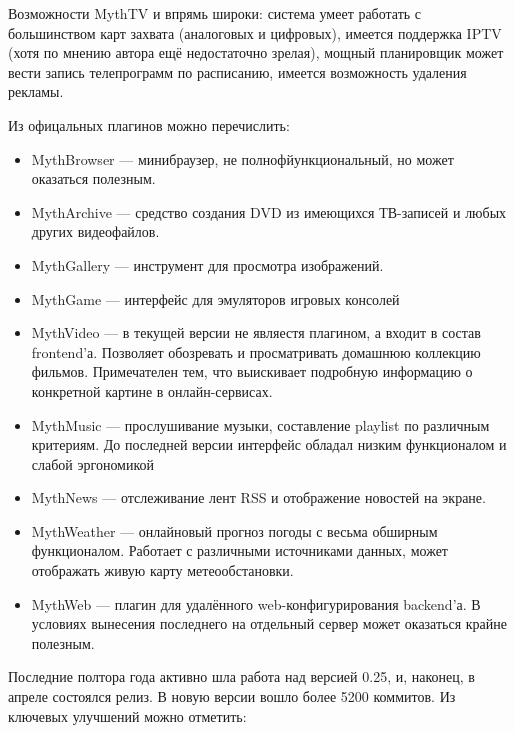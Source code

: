 \documentclass[10pt, a5paper]{article}
\begin{document}
Возможности MythTV и впрямь широки: система умеет работать с большинством карт захвата (аналоговых и цифровых), имеется поддержка IPTV (хотя по мнению автора ещё недостаточно зрелая), мощный планировщик может вести запись телепрограмм по расписанию, имеется возможность удаления рекламы.

Из офицальных плагинов можно перечислить:

\begin{itemize}
  \item MythBrowser --- минибраузер, не полнофйункциональный, но может оказаться полезным.
  \item MythArchive --- средство создания DVD из имеющихся ТВ-записей и любых других видеофайлов.
  \item MythGallery --- инструмент для просмотра изображений.
  \item MythGame --- интерфейс для эмуляторов игровых консолей
  \item MythVideo --- в текущей версии не являестя плагином, а входит в состав frontend'а. Позволяет обозревать и просматривать домашнюю коллекцию фильмов. Примечателен тем, что выискивает подробную информацию о конкретной картине в онлайн-сервисах.
  \item MythMusic --- прослушивание музыки, составление playlist по различным критериям. До последней версии интерфейс обладал низким функционалом и слабой эргономикой
  \item MythNews --- отслеживание лент RSS и отображение новостей на экране.
  \item MythWeather --- онлайновый прогноз погоды с весьма обширным функционалом. Работает с различными источниками данных, может отображать живую карту метеообстановки.
  \item MythWeb --- плагин для удалённого web-конфигурирования backend'а. В условиях вынесения последнего на отдельный сервер может оказаться крайне полезным.
\end{itemize}

Последние полтора года активно шла работа над версией 0.25, и, наконец, в апреле состоялся релиз.  В новую версии вошло более 5200 коммитов. Из ключевых улучшений можно отметить:
\end{document}
